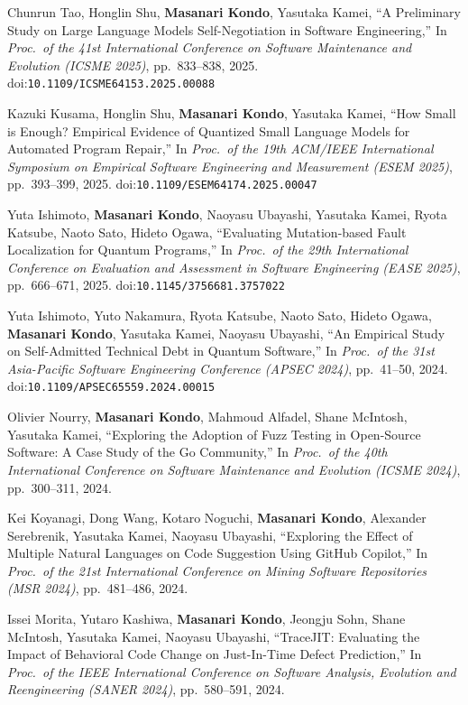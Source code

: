 \documentclass[10pt,a4paper]{article}
\newcommand{\me}{\textbf{Masanari Kondo}}
\begin{document}
\begin{publist}[label={[C\arabic*]}]
  \item Chunrun Tao, Honglin Shu, \me, Yasutaka Kamei, ``A Preliminary Study on Large Language Models Self-Negotiation in Software Engineering,'' In \textit{Proc.\ of the 41st International Conference on Software Maintenance and Evolution (ICSME 2025)}, pp.\ 833--838, 2025. doi:\nolinkurl{10.1109/ICSME64153.2025.00088}
  \item Kazuki Kusama, Honglin Shu, \me, Yasutaka Kamei, ``How Small is Enough? Empirical Evidence of Quantized Small Language Models for Automated Program Repair,'' In \textit{Proc.\ of the 19th ACM/IEEE International Symposium on Empirical Software Engineering and Measurement (ESEM 2025)}, pp.\ 393--399, 2025. doi:\nolinkurl{10.1109/ESEM64174.2025.00047}
  \item Yuta Ishimoto, \me, Naoyasu Ubayashi, Yasutaka Kamei, Ryota Katsube, Naoto Sato, Hideto Ogawa, ``Evaluating Mutation-based Fault Localization for Quantum Programs,'' In \textit{Proc.\ of the 29th International Conference on Evaluation and Assessment in Software Engineering (EASE 2025)}, pp.\ 666--671, 2025. doi:\nolinkurl{10.1145/3756681.3757022}
  \item Yuta Ishimoto, Yuto Nakamura, Ryota Katsube, Naoto Sato, Hideto Ogawa, \me, Yasutaka Kamei, Naoyasu Ubayashi, ``An Empirical Study on Self-Admitted Technical Debt in Quantum Software,'' In \textit{Proc.\ of the 31st Asia-Pacific Software Engineering Conference (APSEC 2024)}, pp.\ 41--50, 2024. doi:\nolinkurl{10.1109/APSEC65559.2024.00015}
  \item Olivier Nourry, \me, Mahmoud Alfadel, Shane McIntosh, Yasutaka Kamei, ``Exploring the Adoption of Fuzz Testing in Open-Source Software: A Case Study of the Go Community,'' In \textit{Proc.\ of the 40th International Conference on Software Maintenance and Evolution (ICSME 2024)}, pp.\ 300--311, 2024.
  \item Kei Koyanagi, Dong Wang, Kotaro Noguchi, \me, Alexander Serebrenik, Yasutaka Kamei, Naoyasu Ubayashi, ``Exploring the Effect of Multiple Natural Languages on Code Suggestion Using GitHub Copilot,'' In \textit{Proc.\ of the 21st International Conference on Mining Software Repositories (MSR 2024)}, pp.\ 481--486, 2024.
  \item Issei Morita, Yutaro Kashiwa, \me, Jeongju Sohn, Shane McIntosh, Yasutaka Kamei, Naoyasu Ubayashi, ``TraceJIT: Evaluating the Impact of Behavioral Code Change on Just-In-Time Defect Prediction,'' In \textit{Proc.\ of the IEEE International Conference on Software Analysis, Evolution and Reengineering (SANER 2024)}, pp.\ 580--591, 2024.

\end{publist}
\end{document}
